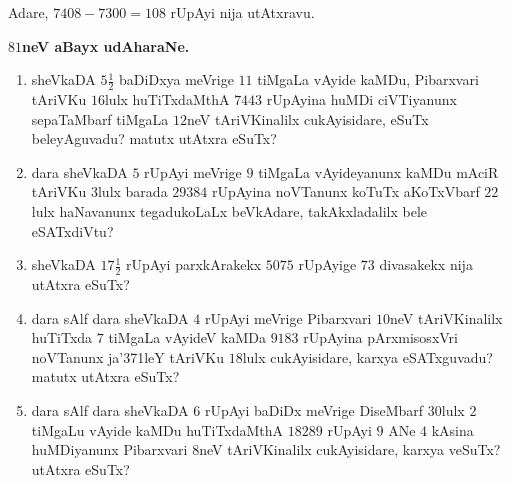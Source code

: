 Adare, $7408-7300=108$ rUpAyi nija utAtxravu.

\begin{center}
{\bf\large $81$neV aBayx udAharaNe.}
\end{center}

\begin{enumerate}[\rm (1)]
\item sheVkaDA $5\tfrac{1}{2}$ baDiDxya meVrige $11$ tiMgaLa vAyide kaMDu, Pibarxvari tAriVKu $16$lulx huTiTxdaMthA $7443$ rUpAyina huMDi ciVTiyanunx sepaTaMbarf tiMgaLa $12$neV tAriVKinalilx cukAyisidare, eSuTx beleyAguvadu? matutx utAtxra eSuTx?

\item dara sheVkaDA $5$ rUpAyi meVrige $9$ tiMgaLa vAyideyanunx kaMDu mAciR tAriVKu $3$lulx barada $29384$ rUpAyina noVTanunx koTuTx aKoTxVbarf $22$lulx haNavanunx tegadukoLaLx beVkAdare, takAkxladalilx bele eSATxdiVtu?

\item sheVkaDA $17\tfrac{1}{2}$ rUpAyi parxkArakekx $5075$ rUpAyige $73$ divasakekx nija utAtxra eSuTx?

\item dara sAlf dara sheVkaDA $4$ rUpAyi meVrige Pibarxvari $10$neV tAriVKinalilx huTiTxda $7$ tiMgaLa vAyideV kaMDa $9183$ rUpAyina pArxmisosxVri noVTanunx ja\char'371leY tAriVKu $18$lulx cukAyisidare, karxya eSATxguvadu? matutx utAtxra eSuTx?

\item dara sAlf dara sheVkaDA $6$ rUpAyi baDiDx meVrige DiseMbarf $30$lulx $2$ tiMgaLu vAyide kaMDu huTiTxdaMthA $18289$ rUpAyi $9$ ANe $4$ kAsina huMDiyanunx Pibarxvari $8$neV tAriVKinalilx cukAyisidare, karxya veSuTx? utAtxra eSuTx?

\end{enumerate}
